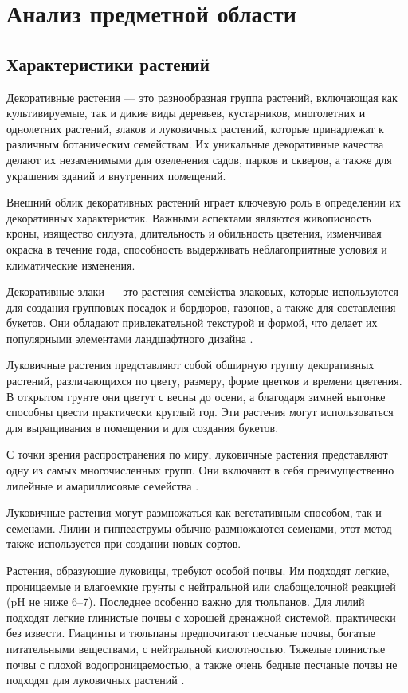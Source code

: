 \section{Анализ предметной области}

\subsection{Характеристики растений}
Декоративные растения — это разнообразная группа растений, включающая как культивируемые, так и дикие виды деревьев, кустарников, многолетних и однолетних растений, злаков и луковичных растений, которые принадлежат к различным ботаническим семействам. Их уникальные декоративные качества делают их незаменимыми для озеленения садов, парков и скверов, а также для украшения зданий и внутренних помещений.

Внешний облик декоративных растений играет ключевую роль в определении их декоративных характеристик. Важными аспектами являются живописность кроны, изящество силуэта, длительность и обильность цветения, изменчивая окраска в течение года, способность выдерживать неблагоприятные условия и климатические изменения.

Декоративные злаки — это растения семейства злаковых, которые используются для создания групповых посадок и бордюров, газонов, а также для составления букетов. Они обладают привлекательной текстурой и формой, что делает их популярными элементами ландшафтного дизайна \cite{kingsberry}.

Луковичные растения представляют собой обширную группу декоративных растений, различающихся по цвету, размеру, форме цветков и времени цветения. В открытом грунте они цветут с весны до осени, а благодаря зимней выгонке способны цвести практически круглый год. Эти растения могут использоваться для выращивания в помещении и для создания букетов.

С точки зрения распространения по миру, луковичные растения представляют одну из самых многочисленных групп. Они включают в себя преимущественно лилейные и амариллисовые семейства \cite{belyaevskaya}.

Луковичные растения могут размножаться как вегетативным способом, так и семенами. Лилии и гиппеаструмы обычно размножаются семенами, этот метод также используется при создании новых сортов.

Растения, образующие луковицы, требуют особой почвы. Им подходят легкие, проницаемые и влагоемкие грунты с нейтральной или слабощелочной реакцией (pH не ниже 6–7). Последнее особенно важно для тюльпанов. Для лилий подходят легкие глинистые почвы с хорошей дренажной системой, практически без извести. Гиацинты и тюльпаны предпочитают песчаные почвы, богатые питательными веществами, с нейтральной кислотностью. Тяжелые глинистые почвы с плохой водопроницаемостью, а также очень бедные песчаные почвы не подходят для луковичных растений \cite{doroshenko}.

